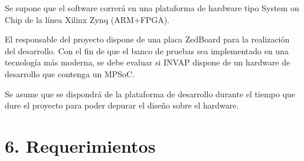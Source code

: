 \documentclass[
11pt, %
]{charter}
\begin{document}
Se supone que el software correrá en una plataforma de hardware tipo System on Chip de la línea Xilinx Zynq (ARM+FPGA).

El responsable del proyecto dispone de una placa ZedBoard para la realización del desarrollo. Con el fin de que el banco de pruebas sea implementado en una tecnología más moderna, se debe evaluar si INVAP dispone de un hardware de desarrollo que contenga un MPSoC.

Se asume que se dispondrá de la plataforma de desarrollo durante el tiempo que dure el proyecto para poder depurar el diseño sobre el hardware.

\section{6. Requerimientos}
\label{sec:requerimientos}
\end{document}
